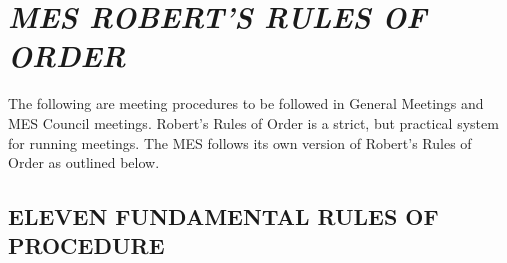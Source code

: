  \section{\texorpdfstring{\emph{MES ROBERT'S RULES OF
     ORDER}}{MES ROBERT'S RULES OF ORDER}}
\label{mes-roberts-rules-of-order}
The following are meeting procedures to be followed in General Meetings
and MES Council meetings. Robert's Rules of Order is a strict, but
practical system for running meetings. The MES follows its own version
of Robert's Rules of Order as outlined below.

\subsection{ELEVEN FUNDAMENTAL RULES OF
  PROCEDURE}
\label{eleven-fundamental-rules-of-procedure}

